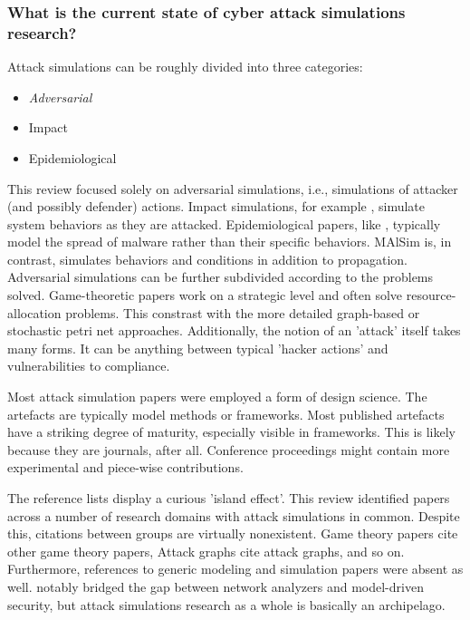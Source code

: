 \documentclass{article}
\begin{document}
\subsubsection{What is the current state of cyber attack simulations research?}

Attack simulations can be roughly divided into three categories:

\begin{itemize}
    \item \textit{Adversarial}
    \item Impact
    \item Epidemiological
\end{itemize}

\noindent This review focused solely on adversarial simulations, i.e., simulations of attacker (and possibly defender) actions. Impact simulations, for example \cite{koutsoukos2017}, simulate system behaviors as they are attacked. Epidemiological papers, like \cite{zou2007}, typically model the spread of malware rather than their specific behaviors. MAlSim \cite{leszczyna2011, leszczyna2010} is, in contrast, simulates behaviors and conditions in addition to propagation.\\

Adversarial simulations can be further subdivided according to the problems solved. Game-theoretic papers work on a strategic level and often solve resource-allocation problems\cite{outkin2019, durkota2019, zhang2016, casey2016, white2014,}. This constrast with the more detailed graph-based\cite{polatidis2018, holm2014} or stochastic petri net\cite{pudar2009} approaches. Additionally, the notion of an 'attack' itself takes many forms. It can be anything between typical 'hacker actions' and vulnerabilities\cite{holm2014, angelini2018} to compliance\cite{casey2016}.

\noindent Most attack simulation papers were employed a form of design science. The artefacts are typically model methods or frameworks. Most published artefacts have a striking degree of maturity, especially visible in frameworks. This is likely because they are journals, after all. Conference proceedings might contain more experimental and piece-wise contributions.



\noindent The reference lists display a curious 'island effect'. This review identified papers across a number of research domains with attack simulations in common. Despite this, citations between groups are virtually nonexistent. Game theory papers cite other game theory papers, Attack graphs cite attack graphs, and so on. Furthermore, references to generic modeling and simulation papers were absent as well. \cite{holm2014} notably bridged the gap between network analyzers and model-driven security, but attack simulations research as a whole is basically an archipelago.
\end{document}
